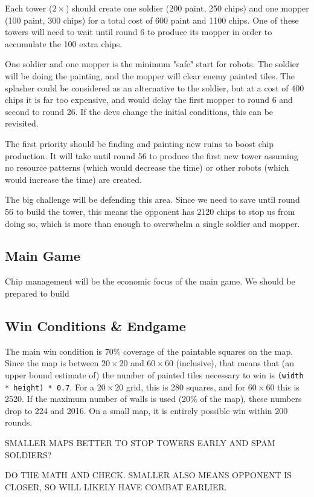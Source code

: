 \documentclass{article}
\begin{document}
  \medskip

  Each tower ($2 \times$) should create one soldier (200 paint, 250 chips) and one mopper (100 paint, 300 chips) for a total cost of 600 paint and 1100 chips. One of these towers will need to wait until round 6 to produce its mopper in order to accumulate the 100 extra chips.

  \medskip

  One soldier and one mopper is the minimum "safe" start for robots. The soldier will be doing the painting, and the mopper will clear enemy painted tiles. The splasher could be considered as an alternative to the soldier, but at a cost of 400 chips it is far too expensive, and would delay the first mopper to round 6 and second to round 26. If the devs change the initial conditions, this can be revisited.

  \medskip

  The first priority should be finding and painting new ruins to boost chip production. It will take until round 56 to produce the first new tower assuming no resource patterns (which would decrease the time) or other robots (which would increase the time) are created.

  \medskip

  The big challenge will be defending this area. Since we need to save until round 56 to build the tower, this means the opponent has 2120 chips to stop us from doing so, which is more than enough to overwhelm a single soldier and mopper.

  \subsection*{Main Game}

  Chip management will be the economic focus of the main game. We should be prepared to build 

  \subsection*{Win Conditions \& Endgame}

  The main win condition is 70\% coverage of the paintable squares on the map. Since the map is between $20 \times 20$ and $60 \times 60$ (inclusive), that means that (an upper bound estimate of) the number of painted tiles necessary to win is \verb|(width * height) * 0.7|. For a $20 \times 20$ grid, this is 280 squares, and for $60 \times 60$ this is 2520. If the maximum number of walls is used (20\% of the map), these numbers drop to 224 and 2016. On a small map, it is entirely possible win within 200 rounds.
  \begin{center}
    SMALLER MAPS BETTER TO STOP TOWERS EARLY AND SPAM SOLDIERS?
    
    DO THE MATH AND CHECK. SMALLER ALSO MEANS OPPONENT IS CLOSER, SO WILL LIKELY HAVE COMBAT EARLIER.
  \end{center}
\end{document}
